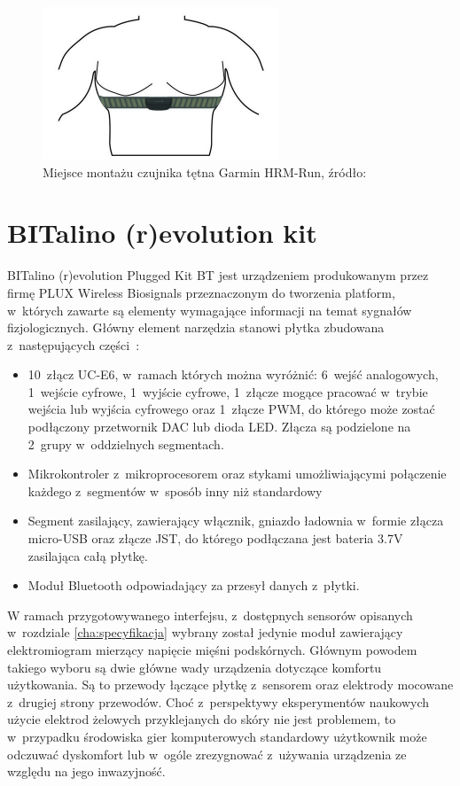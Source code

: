\begin{figure}
	\centering
	\includegraphics[width=0.5\linewidth]{images/garmin_hrm_placement.png}
	\caption{Miejsce montażu czujnika tętna Garmin HRM-Run, źródło:~\cite{garmin_manual}}
	\label{fig:garmin_placement}
\end{figure}

\section{BITalino (r)evolution kit}
BITalino (r)evolution Plugged Kit BT jest urządzeniem produkowanym przez firmę PLUX Wireless Biosignals przeznaczonym do tworzenia platform, w~których zawarte są elementy wymagające informacji na temat sygnałów fizjologicznych. Główny element narzędzia stanowi płytka zbudowana z~następujących części~\cite{bitalino_documentation}:
\begin{itemize}
	\item 10~złącz UC-E6, w~ramach których można wyróżnić: 6~wejść analogowych, 1~wejście cyfrowe, 1~wyjście cyfrowe, 1~złącze mogące pracować w~trybie wejścia lub wyjścia cyfrowego oraz 1~złącze PWM, do którego może zostać podłączony przetwornik DAC lub dioda LED. Złącza są podzielone na 2~grupy w~oddzielnych segmentach.
	\item Mikrokontroler z~mikroprocesorem oraz stykami umożliwiającymi połączenie każdego z~segmentów w~sposób inny niż standardowy
	\item Segment zasilający, zawierający włącznik, gniazdo ładownia w~formie złącza micro-USB oraz złącze JST, do którego podłączana jest bateria 3.7V zasilająca całą płytkę.
	\item Moduł Bluetooth odpowiadający za przesył danych z~płytki.
\end{itemize}

W ramach przygotowywanego interfejsu, z~dostępnych sensorów opisanych w~rozdziale \ref{cha:specyfikacja} wybrany został jedynie moduł zawierający elektromiogram mierzący napięcie mięśni podskórnych. Głównym powodem takiego wyboru są dwie główne wady urządzenia dotyczące komfortu użytkowania. Są to przewody łączące płytkę z~sensorem oraz elektrody mocowane z~drugiej strony przewodów. Choć z~perspektywy eksperymentów naukowych użycie elektrod żelowych przyklejanych do skóry nie jest problemem, to w~przypadku środowiska gier komputerowych standardowy użytkownik może odczuwać dyskomfort lub w~ogóle zrezygnować z~używania urządzenia ze względu na jego inwazyjność.

